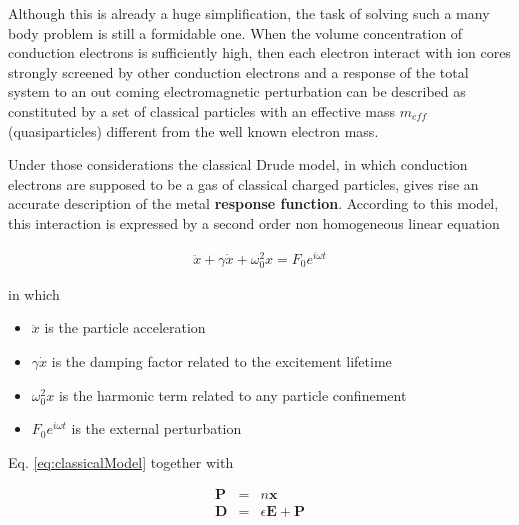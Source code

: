 Although this is already a huge simplification, the task of solving such a many body problem is still a formidable one. When the volume concentration of conduction electrons is sufficiently high, then each electron interact with ion cores strongly screened by other conduction electrons and a response of the total system to an out coming electromagnetic perturbation can be described as constituted by a set of classical particles with an effective mass $m_{eff}$ (quasiparticles) different from the well known electron mass.


Under those considerations the classical Drude model, in which conduction electrons are supposed to be a gas of classical charged particles, gives rise an accurate description of the metal {\bf response function}. According to this model, this interaction is expressed by a second order non homogeneous linear equation

\begin{eqnarray}\label{eq:classicalModel}
	\ddot{x} + \gamma\dot{x} + \omega_0^2 x = F_0e^{i\omega t}
\end{eqnarray}

in which
\begin{itemize}
	\item $\ddot{x}$ is the particle acceleration
	\item $\gamma\dot{x}$ is the damping factor related to the excitement lifetime
	\item $\omega_0^2 x$ is the harmonic term related to any particle confinement
	\item $F_0e^{i\omega t}$ is the external perturbation
\end{itemize}


Eq. \ref{eq:classicalModel} together with

\begin{eqnarray}
	\mathbf{P} & = & n\mathbf{x}\\
	\mathbf{D} & = & \epsilon\mathbf{E} + \mathbf{P}	
\end{eqnarray}

